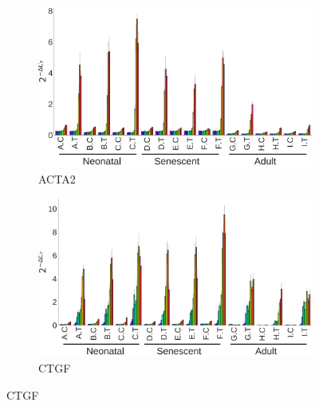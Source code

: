 \documentclass[alpha-refs]{wiley-article}
\begin{document}
\begin{figure}[p]
\begin{minipage}{0.9\textwidth}
		\begin{subfigure}[b]{0.45\textwidth}
			\includegraphics[width=\textwidth]{img/dct_for_publication_no_legend/ACTA2}
			\caption{ACTA2}\label{ACTA2}
		\end{subfigure}\hspace*{\fill}
		\begin{subfigure}[b]{0.45\textwidth}
			\includegraphics[width=\textwidth]{img/dct_for_publication_no_legend/CTGF}
			\caption{CTGF}\label{CTGF}
		\end{subfigure}\hspace*{\fill}
		

\end{minipage}
\end{figure}
\end{document}
